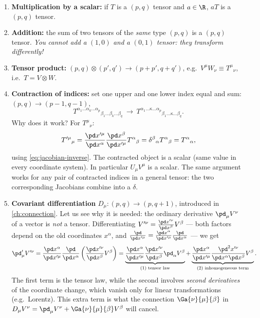 \begin{enumerate}[label=(\roman*)]
\item \textbf{Multiplication by a scalar:} if $T$ is a $(p,q)$ tensor and $a\in\R$, $aT$ is a $(p,q)$ tensor.
\item \textbf{Addition:} the sum of two tensors of the \emph{same} type $(p,q)$ is a $(p,q)$ tensor. \emph{You cannot add a $(1,0)$ and a $(0,1)$ tensor: they transform differently!}
\item \textbf{Tensor product:} $(p,q)\otimes(p',q')\to(p+p',q+q')$, e.g.\ $V^\mu W_\nu\equiv T^\mu{}_\nu$, i.e.\ $T=V\otimes W$.
\item \textbf{Contraction of indices:} set one upper and one lower index equal and sum: $(p,q)\to(p-1,q-1)$,
\[
  T^{\alpha_1\dots\alpha_k\dots\alpha_p}{}_{\beta_1\dots\beta_k\dots\beta_q}\ \longrightarrow\ T^{\alpha_1\dots\kappa\dots\alpha_p}{}_{\beta_1\dots\kappa\dots\beta_q}.
\]
Why does it work? For $T^\mu{}_\nu$:
\[
  T'^\mu{}_\mu=\frac{\pd x'^\mu}{\pd x^\alpha}\frac{\pd x^\beta}{\pd x'^\mu}T^\alpha{}_\beta=\delta^\beta{}_\alpha T^\alpha{}_\beta=T^\alpha{}_\alpha ,
\]
using \eqref{eq:jacobian-inverse}. The contracted object is a scalar (same value in every coordinate system). In particular $U_\mu V^\mu$ is a scalar. The same argument works for any pair of contracted indices in a general tensor: the two corresponding Jacobians combine into a $\delta$.
\item \textbf{Covariant differentiation} $D_\mu:(p,q)\to(p,q+1)$, introduced in \cref{ch:connection}. Let us see why it is needed: the ordinary derivative $\pd_\mu V^\nu$ of a vector is \emph{not} a tensor. Differentiating $V'^\nu=\frac{\pd x'^\nu}{\pd x^\beta}V^\beta$ --- both factors depend on the old coordinates $x^\alpha$, and $\frac{\pd}{\pd x'^\mu}=\frac{\pd x^\alpha}{\pd x'^\mu}\frac{\pd}{\pd x^\alpha}$ --- we get
\begin{equation}
  \pd'_\mu V'^\nu=\frac{\pd x^\alpha}{\pd x'^\mu}\frac{\pd}{\pd x^\alpha}\left(\frac{\pd x'^\nu}{\pd x^\beta}V^\beta\right)
  =\underbrace{\frac{\pd x^\alpha}{\pd x'^\mu}\frac{\pd x'^\nu}{\pd x^\beta}\pd_\alpha V^\beta}_{\text{(1) tensor law}}
  +\underbrace{\frac{\pd x^\alpha}{\pd x'^\mu}\frac{\pd^2x'^\nu}{\pd x^\alpha\pd x^\beta}V^\beta}_{\text{(2) inhomogeneous term}} .
  \label{eq:partial-not-tensor}
\end{equation}
The first term is the tensor law, while the second involves \emph{second derivatives} of the coordinate change, which vanish only for linear transformations (e.g.\ Lorentz). This extra term is what the connection $\Ga{\nu}{\mu}{\beta}$ in $D_\mu V^\nu=\pd_\mu V^\nu+\Ga{\nu}{\mu}{\beta}V^\beta$ will cancel.
\end{enumerate}

